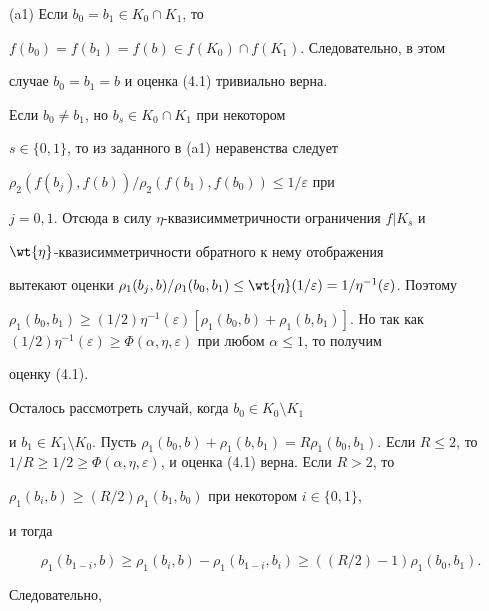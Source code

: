 \begin{pf}


(a1) Если $b_0=b_1 \in K_0\cap K_1$, то 


$f(b_0)=f(b_1)=f(b)\in f(K_0)\cap f(K_1)$. Следовательно, в этом 


случае $b_0=b_1=b$ и оценка (4.1) тривиально верна.


Если $b_0 {\neq} b_1$, но $b_s \in K_0\cap K_1$ при некотором 


$s \in \{ 0,1\} $, то из заданного в (a1) неравенства следует


$\rho_2(f(b_j), f(b))/ \rho_2(f(b_1), f(b_0)) \leq 1/\varepsilon$ при 


$j=0,1$. Отсюда в силу $\eta$-{}квазисимметричности ограничения $f|K_s$ и 


$\wt{\eta}$-{}квазисимметричности обратного к нему отображения 


вытекают оценки $\rho_1(b_j, b)/ \rho_1(b_0, b_1) \leq 


\wt{\eta}(1/\varepsilon)=1/\eta^{-1}(\varepsilon)$. Поэтому 


$\rho_1(b_0, b_1) \geq (1/2)\eta^{-1}(\varepsilon)[\rho_1(b_0,b)+


\rho_1(b, b_1)]$. Но так как $(1/2)\eta^{-1}(\varepsilon) \geq \Phi(\alpha, 


\eta, \varepsilon)$ при любом $\alpha \leq 1$, то получим


оценку (4.1). 





Осталось рассмотреть случай, когда $b_0 \in K_0\setminus K_1$ 


и $b_1 \in K_1\setminus K_0$. Пусть $\rho_1(b_0,b)+\rho_1(b,b_1)=


R\rho_1(b_0, b_1)$. Если $R\leq 2$, то $1/R \geq 1/2 \geq \Phi(\alpha, 


\eta, \varepsilon)$, и оценка (4.1) верна. Если $R > 2$, то 


$\rho_1(b_i, b) \geq (R/2)\rho_1(b_1,b_0)$ при некотором $i\in \{ 0,1\} $, 


и тогда


$$


\rho_1(b_{1-i}, b) \geq \rho_1(b_i, b)-\rho_1(b_{1-i}, b_i) \geq 


((R/2) -1)\rho_1(b_0, b_1). 


$$


Следовательно, 


\begin{equation}



\end{equation}
\end{pf}
